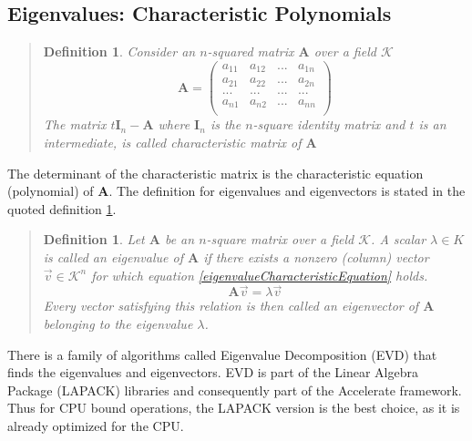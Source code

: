 \documentclass[11pt]{article}
\newtheorem{adef}[thm]{Definition}
\begin{document}
\subsection{Eigenvalues: Characteristic Polynomials}
\begin{quote}
	\begin{adef}
		Consider an $n$-squared matrix $\mathbf{A}$ over a field $\mathcal{K}$
		\begin{equation}
			\mathbf{A} = 
			\left(
			\begin{array}{cccc}
				a_{11}  &a_{12}  & ... &a_{1n}     \\
				a_{21}  &a_{22}  & ... &a_{2n}     \\
				...& ...& ...&... \\
				a_{n1}  &a_{n2}  & ... &a_{nn}     \\
			\end{array}
			\right)
		\end{equation}
		The matrix $t\mathbf{I}_n - \mathbf{A}$ where $\mathbf{I}_n$ is the $n$-square identity matrix and $t$ is an intermediate, is called characteristic matrix of $\mathbf{A}$
	\end{adef}
	\cite[281]{schaums-linear-algebra}
\end{quote}
The determinant of the characteristic matrix is the characteristic equation (polynomial) of $\mathbf{A}$.  The definition for eigenvalues and eigenvectors is stated in the quoted definition \ref{eigenvalueDefinition}.
\begin{quote}
\begin{adef}
	\label{eigenvalueDefinition}
Let $\mathbf{A}$ be an $n$-square matrix over a field $\mathcal{K}$.  A scalar $\lambda \in K$ is called an eigenvalue of $\mathbf{A}$ if there exists a nonzero (column) vector $\vec{v}\in \mathcal{K}^n$ for which equation \ref{eigenvalueCharacteristicEquation} holds.
\begin{equation}
\mathbf{A}\vec{v} = \lambda \vec{v}  \label{eigenvalueCharacteristicEquation}
\end{equation}
Every vector satisfying this relation is then called an eigenvector of $\mathbf{A}$ belonging to the eigenvalue $\lambda$.
\end{adef}
\cite[284]{schaums-linear-algebra}
\end{quote}
There is a family of algorithms called Eigenvalue Decomposition (EVD) that finds the eigenvalues and eigenvectors.   EVD is part of the Linear Algebra Package (LAPACK) libraries and consequently part of the Accelerate framework\cite{apple-accelerate-framework}.  Thus for CPU bound operations, the LAPACK version is the best choice, as it is already optimized for the CPU.   
\end{document}
